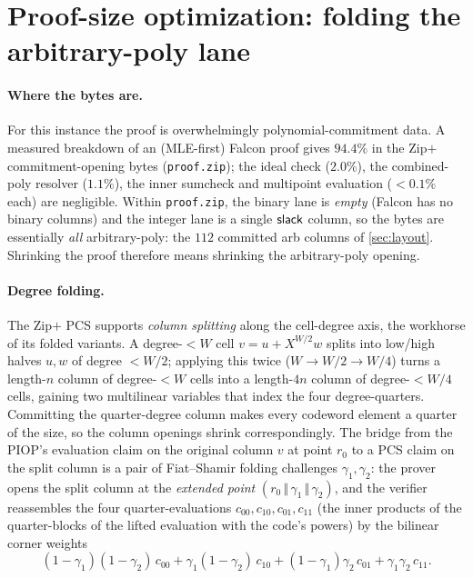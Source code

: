 \section{Proof-size optimization: folding the arbitrary-poly lane}\label{sec:folding}

\paragraph{Where the bytes are.}
For this instance the proof is overwhelmingly polynomial-commitment data.
A measured breakdown of an (MLE-first) Falcon proof gives
\emph{$94.4\%$} in the Zip$+$ commitment-opening bytes
(\texttt{proof.zip}); the ideal check ($2.0\%$), the combined-poly resolver
($1.1\%$), the inner sumcheck and multipoint evaluation
($<0.1\%$ each) are negligible. Within \texttt{proof.zip}, the binary lane
is \emph{empty} (Falcon has no binary columns) and the integer lane is a
single $\mathsf{slack}$ column, so the bytes are essentially \emph{all}
arbitrary-poly: the $112$ committed arb columns of \cref{sec:layout}.
Shrinking the proof therefore means shrinking the arbitrary-poly opening.

\paragraph{Degree folding.}
The Zip$+$ PCS supports \emph{column splitting} along the cell-degree axis,
the workhorse of its folded variants. A degree-$<W$ cell
$v = u + X^{W/2} w$ splits into low/high halves $u, w$ of degree $<W/2$;
applying this twice ($W \to W/2 \to W/4$) turns a length-$n$ column of
degree-$<W$ cells into a length-$4n$ column of degree-$<W/4$ cells, gaining
two multilinear variables that index the four degree-quarters. Committing
the quarter-degree column makes every codeword element a quarter of the
size, so the column openings shrink correspondingly. The bridge from the
PIOP's evaluation claim on the original column $v$ at point $r_0$ to a PCS
claim on the split column is a pair of Fiat--Shamir folding challenges
$\gamma_1, \gamma_2$: the prover opens the split column at the
\emph{extended point} $(r_0 \,\Vert\, \gamma_1 \,\Vert\, \gamma_2)$, and the
verifier reassembles the four quarter-evaluations $c_{00}, c_{10}, c_{01},
c_{11}$ (the inner products of the quarter-blocks of the lifted evaluation
with the code's powers) by the bilinear corner weights
\begin{equation}\label{eq:fourblock}
  (1-\gamma_1)(1-\gamma_2)\,c_{00}
  + \gamma_1(1-\gamma_2)\,c_{10}
  + (1-\gamma_1)\gamma_2\,c_{01}
  + \gamma_1\gamma_2\,c_{11}.
\end{equation}

